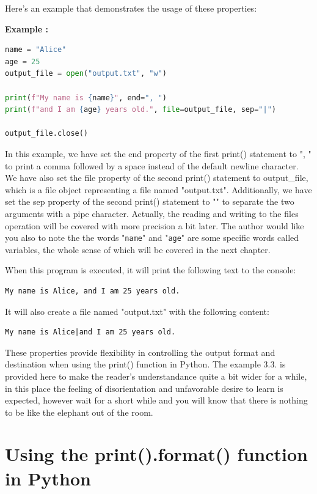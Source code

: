 \documentclass[12pt]{book}
\newtheorem{Example}{Example}[chapter]
\renewenvironment{Example}{\begin{trivlist}\item\relax
\textbf{Example \thesection: }}{\end{trivlist}}
\begin{document}
Here's an example that demonstrates the usage of these properties:

\begin{Example}
\begin{lstlisting}[language=Python]
name = "Alice"
age = 25
output_file = open("output.txt", "w")

print(f"My name is {name}", end=", ")
print(f"and I am {age} years old.", file=output_file, sep="|")

output_file.close()
\end{lstlisting}
\end{Example}

In this example, we have set the end property of the first print() statement to ", " to print a comma followed by a space instead of the default newline character. We have also set the file property of the second print() statement to output\_file, which is a file object representing a file named "output.txt". Additionally, we have set the sep property of the second print() statement to "\textbar{}" to separate the two arguments with a pipe character. Actually, the reading and writing to the files operation will be covered with more precision a bit later.
The author would like you also to note the the words "\texttt{name}" and "\texttt{age}" are some specific words called variables, the whole sense of which will be covered in the next chapter.

When this program is executed, it will print the following text to the console:

\begin{verbatim}
My name is Alice, and I am 25 years old.
\end{verbatim}

It will also create a file named "output.txt" with the following content:

\begin{verbatim}
My name is Alice|and I am 25 years old.
\end{verbatim}

These properties provide flexibility in controlling the output format and destination when using the print() function in Python. The example 3.3. is provided here to make the reader's understandance quite a bit wider for a while, in this place the feeling of disorientation and unfavorable desire to learn is expected, however wait for a short while and you will know that there is nothing to be like the elephant out of the room. 

\section{Using the print().format() function in Python}
\end{document}
